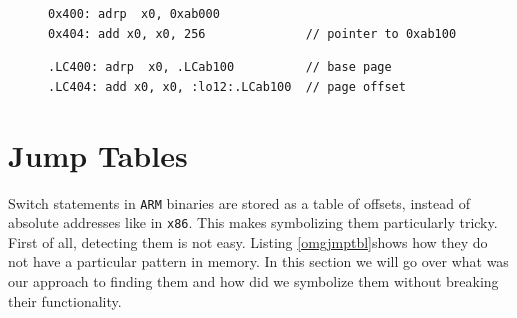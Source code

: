 \documentclass[a4paper,11pt,oneside]{report}
\begin{document}
\begin{figure}[h]
\label{lst:construction}
\begin{minipage}{\textwidth}
\begin{lstlisting}[basicstyle=\ttfamily\small]
0x400: adrp  x0, 0xab000
0x404: add x0, x0, 256              // pointer to 0xab100
\end{lstlisting}
\end{minipage}

\begin{minipage}{\textwidth}
	\begin{lstlisting}[basicstyle=\ttfamily\small]
.LC400: adrp  x0, .LCab100          // base page 
.LC404: add x0, x0, :lo12:.LCab100  // page offset
\end{lstlisting}
\end{minipage}
\end{figure}



\section{Jump Tables}

Switch statements in \texttt{ARM} binaries are stored as a table of offsets,
instead of absolute addresses like in \texttt{x86}. This makes symbolizing them
particularly tricky. First of all, detecting them is not easy. Listing
\ref{omgjmptbl}shows how they do not have a particular pattern in memory. In
this section we will go over what was our approach to finding them and how did
we symbolize them without breaking their functionality.
\end{document}

